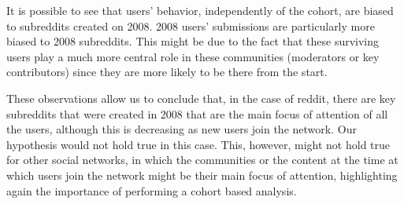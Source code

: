 It is possible to see that users' behavior, independently of the cohort, are biased to subreddits created on 2008. 2008 users' submissions are particularly more biased to 2008 subreddits. This might be due to the fact that these surviving users play a much more central role in these communities (moderators or key contributors) since they are more likely to be there from the start.

These observations allow us to conclude that, in the case of reddit, there are key subreddits that were created in 2008 that are the main focus of attention of all the users, although this is decreasing as new users join the network. Our hypothesis would not hold true in this case. This, however, might not hold true for other social networks, in which the communities or the content at the time at which users join the network might be their main focus of attention, highlighting again the importance of performing a cohort based analysis.
